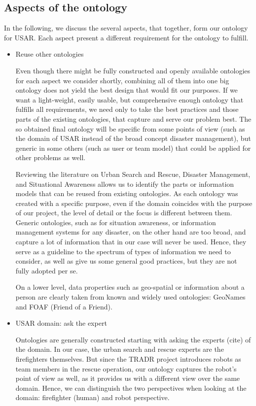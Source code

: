 \subsection{Aspects of the ontology} 
In the following, we discuss the several aspects, that together, form our ontology for USAR. Each aspect present a different requirement for the ontology to fulfill. 
\begin{itemize}
\item Reuse other ontologies

Even though there might be fully constructed and openly available ontologies for each aspect we consider shortly, combining all of them into one big ontology does not yield the best design that would fit our purposes. If we want a light-weight, easily usable, but comprehensive enough ontology that fulfills all requirements, we need only to take the best practices and those parts of the existing ontologies, that capture and serve our problem best. The so obtained final ontology will be specific from some points of view (such as the domain of USAR instead of the broad concept disaster management), but generic in some others (such as user or team model) that could be applied for other problems as well.

Reviewing the literature on Urban Search and Rescue, Disaster Management, and Situational Awareness allows us to identify the parts or information models that can be reused from existing ontologies. As each ontology was created with a specific purpose, even if the domain coincides with the purpose of our project, the level of detail or the focus is different between them. Generic ontologies, such as for situation awareness, or information management systems for any disaster, on the other hand are too broad, and capture a lot of information that in our case will never be used. Hence, they serve as a guideline to the spectrum of types of information we need to consider, as well as give us some general good practices, but they are not fully adopted per se. 

On a lower level, data properties such as geo-spatial or information about a person are clearly taken from known and widely used ontologies: GeoNames and FOAF (Friend of a Friend). 


\item USAR domain: ask the expert 

Ontologies are generally constructed starting with asking the experts (cite) of the domain. In our case, the urban search and rescue experts are the firefighters themselves. But since the TRADR project introduces robots as team members in the rescue operation, our ontology captures the robot's point of view as well, as it provides us with a different view over the same domain. Hence, we can distinguish the two perspectives when looking at the domain: firefighter (human) and robot perspective.
\begin{itemize}


\end{itemize}
\end{itemize}
